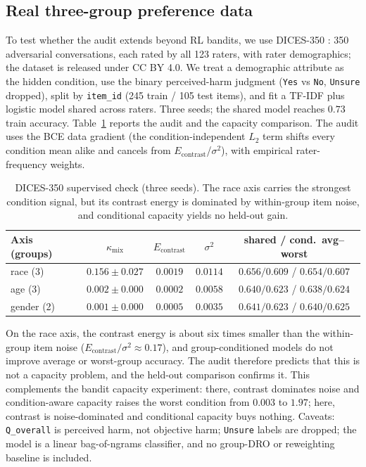\documentclass{article}
\newcommand{\kmix}{\kappa_{\mathrm{mix}}}
\begin{document}
\subsection{Real three-group preference data}
\label{sec:exp-dices}

To test whether the audit extends beyond RL bandits, we use DICES-350
\citep{arroyo2023dices}: 350 adversarial conversations, each rated by all 123
raters, with rater demographics; the dataset is released under CC BY 4.0. We
treat a demographic attribute as the hidden condition, use
the binary perceived-harm judgment (\texttt{Yes} vs \texttt{No},
\texttt{Unsure} dropped), split by \texttt{item\_id} (245 train / 105 test
items), and fit a TF-IDF plus logistic model shared across raters. Three
seeds; the shared model reaches $0.73$ train accuracy. Table~\ref{tab:dices}
reports the audit and the capacity comparison. The audit uses the BCE data
gradient (the condition-independent $L_2$ term shifts every condition mean
alike and cancels from $E_{\mathrm{contrast}}$/$\sigma^2$), with empirical
rater-frequency weights.

\begin{table}[t]
\caption{DICES-350 supervised check (three seeds). The race axis carries the
strongest condition signal, but its contrast energy is dominated by
within-group item noise, and conditional capacity yields no held-out gain.}
\label{tab:dices}
\begin{center}
\begin{tabular}{lcccc}
\toprule
Axis (groups) & $\kmix$ & $E_{\mathrm{contrast}}$ & $\sigma^2$ &
shared / cond.\ avg--worst \\
\midrule
race (3) & $0.156\pm0.027$ & $0.0019$ & $0.0114$ & $0.656/0.609$ / $0.654/0.607$ \\
age (3) & $0.002\pm0.000$ & $0.0002$ & $0.0058$ & $0.640/0.623$ / $0.638/0.624$ \\
gender (2) & $0.001\pm0.000$ & $0.0005$ & $0.0035$ & $0.641/0.623$ / $0.640/0.625$ \\
\bottomrule
\end{tabular}
\end{center}
\end{table}

On the race axis, the contrast energy is about six times smaller than the
within-group item noise ($E_{\mathrm{contrast}}/\sigma^2\approx0.17$), and
group-conditioned models do not improve average or worst-group accuracy. The
audit therefore predicts that this is not a capacity problem, and the
held-out comparison confirms it. This complements the bandit capacity
experiment: there, contrast dominates noise and condition-aware capacity
raises the worst condition from $0.003$ to $1.97$; here, contrast is
noise-dominated and conditional capacity buys nothing. Caveats:
\texttt{Q\_overall} is perceived harm, not objective harm; \texttt{Unsure}
labels are dropped; the model is a linear bag-of-ngrams classifier, and no
group-DRO or reweighting baseline is included.
\end{document}
